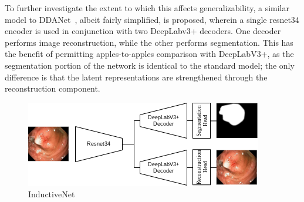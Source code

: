 To further investigate the extent to which this affects generalizability, a similar model to DDANet~\cite{ddanet}, albeit fairly simplified, is proposed, wherein a single resnet34 encoder is used in conjunction with two DeepLabv3+ decoders. One decoder performs image reconstruction, while the other performs segmentation. This has the benefit of permitting apples-to-apples comparison with DeepLabV3+, as the segmentation portion of the network is identical to the standard model; the only difference is that the latent representations are strengthened through the reconstruction component. 

\begin{figure}[ht]
    \centering
    \includegraphics[width=\linewidth]{illustrations/InductiveNet.png}
    \caption{InductiveNet}
    \label{fig:my_label}
\end{figure}
